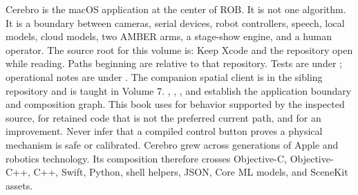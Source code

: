 \markdownRendererDocumentBegin
\markdownRendererSectionBegin
{}\markdownRendererInterblockSeparator
{}Cerebro is the macOS application at the center of ROB. It is not one algorithm. It is a boundary between cameras, serial devices, robot controllers, speech, local models, cloud models, two AMBER arms, a stage-show engine, and a human operator. The source root for this volume is:\markdownRendererInterblockSeparator
{}\markdownRendererInterblockSeparator
{}Keep Xcode and the repository open while reading. Paths beginning  are relative to that repository. Tests are under ; operational notes are under . The companion spatial client is in the sibling  repository and is taught in Volume 7.\markdownRendererInterblockSeparator
{}\markdownRendererBlockQuoteBegin
{} , , , and  establish the application boundary and composition graph.\markdownRendererBlockQuoteEnd \markdownRendererInterblockSeparator
{}This book uses  for behavior supported by the inspected source,  for retained code that is not the preferred current path, and  for an improvement. Never infer that a compiled control button proves a physical mechanism is safe or calibrated.\markdownRendererInterblockSeparator
{}
\markdownRendererSectionEnd \markdownRendererSectionBegin
{}\markdownRendererInterblockSeparator
{}Cerebro grew across generations of Apple and robotics technology. Its composition therefore crosses Objective-C, Objective-C++, C++, Swift, Python, shell helpers, JSON, Core ML models, and SceneKit assets.\markdownRendererInterblockSeparator
